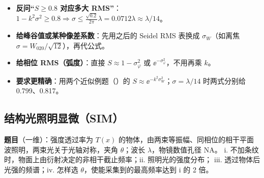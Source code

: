 \begin{warn}[变式]
\begin{itemize}
\item \textbf{反问“$S\ge0.8$ 对应多大 RMS”}：$1-k^2\sigma^2\ge0.8\Rightarrow\sigma\le\frac{\sqrt{0.2}}{2\pi}\lambda=0.0712\lambda\approx\lambda/14$。
\item \textbf{给峰谷值或某种像差系数}：先用\pageref{sec:strehl}之后的 Seidel RMS 表换成 $\sigma_W$（如离焦 $\sigma=W_{020}/\sqrt{12}$），再代公式。
\item \textbf{给相位 RMS（弧度）}：直接 $S\approx1-\sigma_\varphi^2$ 或 $\ee^{-\sigma_\varphi^2}$，不用再乘 $k$。
\item \textbf{要求更精确}：用两个近似例题（\pageref{ex:v-strehl2}）的 $S\approx\ee^{-k^2\sigma_W^2}$；$\sigma=\lambda/14$ 时两式分别给 0.799、0.817。
\end{itemize}
\end{warn}

\subsection{结构光照明显微（SIM）}\label{ex:v-sim}
\noindent\textbf{题目}（一维）：强度透过率为 $T(x)$ 的物体，由两束等振幅、同相位的相干平面波照明，两束光关于光轴对称，夹角 $\theta$；波长 $\lambda$，物镜数值孔径 NA。
i. 不加条纹时，物面上由衍射决定的非相干截止频率；ii. 照明光的强度分布；
iii. 透过物体后光强的频谱；iv. 怎样选 $\theta$，使能采集到的最高频率达到 i 的 2 倍。

